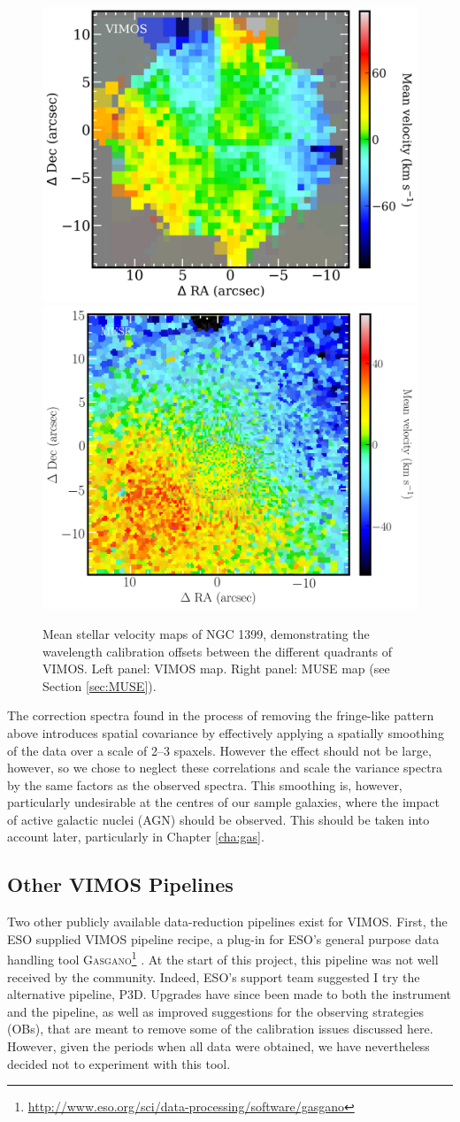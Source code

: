 		\begin{figure}
			\centering
			\includegraphics[width=.4\textwidth]{chapter2/VIMOS_NGC1399_vel.png}
			\includegraphics[width=.4\textwidth]{chapter2/MUSE_NGC1399_vel.png}
			\caption[VIMOS data wavelength calibration problems]{Mean stellar velocity maps of NGC 1399, demonstrating the  wavelength calibration offsets between the different quadrants of VIMOS. Left panel: VIMOS map. Right panel: MUSE map (see Section \ref{sec:MUSE}).}
			\label{fig:egVel}
		\end{figure}

		The correction spectra found in the process of removing the fringe-like pattern above introduces spatial covariance by effectively applying a spatially smoothing of the data over a scale of 2--3 spaxels. However the effect should not be large, however, so we chose to neglect these correlations and scale the variance spectra by the same factors as the observed spectra. This smoothing is, however, particularly undesirable at the centres of our sample galaxies, where the impact of active galactic nuclei (AGN) should be observed. This should be taken into account later, particularly in Chapter \ref{cha:gas}.


	\subsection{Other VIMOS Pipelines}
		\label{subsec:Other}
		Two other publicly available data-reduction pipelines exist for VIMOS. First, the ESO supplied VIMOS pipeline recipe, a plug-in for ESO's general purpose data handling tool \textsc{Gasgano}\footnote{\url{http://www.eso.org/sci/data-processing/software/gasgano}} \citep{Izzo2004, ESO2012}. At the start of this project, this pipeline was not well received by the community. Indeed, ESO's support team suggested I try the alternative pipeline, \textsc{P3D}. Upgrades have since been made to both the instrument and the pipeline, as well as improved suggestions for the observing strategies (OBs), that are meant to remove some of the calibration issues discussed here. However, given the periods when all data were obtained, we have nevertheless decided not to experiment with this tool.
		

